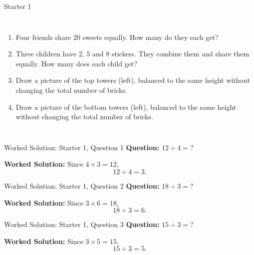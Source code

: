 \documentclass{beamer}
\newcommand{\ashow}[1]{\uncover<2->{\textcolor{red}{\small #1}}}
\newcommand{\ashowq}[1]{\alt<2->{\textcolor{red}{\small #1}}{?}}
\begin{document}
\begin{frame}{Starter 1}
\begin{columns}[T]
\footnotesize
\vspace{0.2em}
\begin{enumerate}\itemsep1pt
  \item Four friends share 20 sweets equally. How many do they each get? \ashow{5 sweets}
  \item Three children have 2, 5 and 8 stickers. They combine them and share them equally. How many does each child get? \ashow{5 stickers}
  \item Draw a picture of the top towers (left), balanced to the same height without changing the total number of bricks.
  \item Draw a picture of the bottom towers (left), balanced to the same height without changing the total number of bricks.
\end{enumerate}

\end{columns}
\end{frame}

\begin{frame}{Worked Solution: Starter 1, Question 1}
\hypertarget{work-st1}{}
\textbf{Question:} \(12 \div 4 = ?\)

\textbf{Worked Solution:}
Since \(4 \times 3 = 12\),
\[
12 \div 4 = 3.
\]
\end{frame}

\begin{frame}{Worked Solution: Starter 1, Question 2}
\textbf{Question:} \(18 \div 3 = ?\)

\textbf{Worked Solution:}
Since \(3 \times 6 = 18\),
\[
18 \div 3 = 6.
\]
\end{frame}

\begin{frame}{Worked Solution: Starter 1, Question 3}
\textbf{Question:} \(15 \div 3 = ?\)

\textbf{Worked Solution:}
Since \(3 \times 5 = 15\),
\[
15 \div 3 = 5.
\]
\end{frame}
\end{document}
